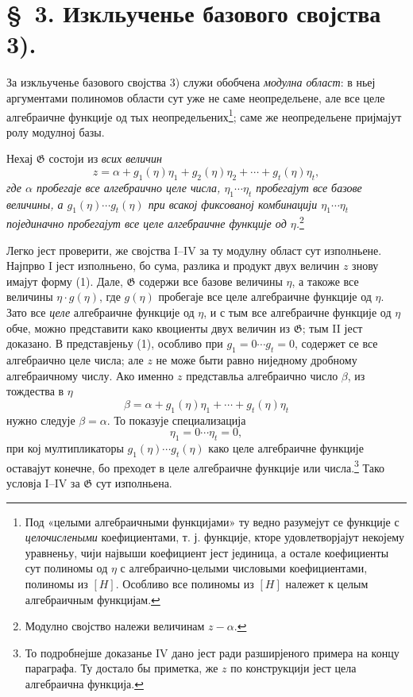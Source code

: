 ﻿\documentclass[11pt]{article}
\begin{document}
\section*{\S\ 3. Изкльученье базового својства 3).}

За изкльученье базового својства 3) служи обобчена
{\itshape модулна област}: в ньеј аргументами полиномов области сут уже не саме
неопредельене, але все целе алгебраичне функције од тых
неопредельених\footnote{Под «целыми алгебраичными функцијами» ту ведно
разумејут се функције с {\itshape целочислеными} коефициентами, т. ј. функције,
кторе удовлетворјајут некојему уравненьу, чији највыши коефициент јест
јединица, а остале коефициенты сут полиномы од $\eta$ с алгебраично-целыми
числовыми коефициентами, полиномы из $[H]$. Особливо все полиномы из $[H]$
належет к целым алгебраичным функцијам.}; саме же неопредельене пријмајут ролу
модулној базы.

Нехај $\mathfrak G$ состоји из {\itshape всих величин}
\begin{equation}
 z=\alpha+g_1(\eta)\eta_1+g_2(\eta)\eta_2+\cdots+g_t(\eta)\eta_t,
\tag{1}
\end{equation}
{\itshape где $\alpha$ пробегаје все алгебраично целе числа,
$\eta_1\cdots\eta_t$ пробегајут все базове величины, а
$g_1(\eta)\cdots g_t(\eta)$ при всакој фиксованој комбинацији
$\eta_1\cdots\eta_t$ појединачно пробегајут все целе алгебраичне функције од
$\eta$.}\footnote{Модулно својство належи величинам $z-\alpha$.}

Легко јест проверити, же својства I--IV за ту модулну област сут изполньене.
Најпрво I јест изполньено, бо сума, разлика и продукт двух величин $z$ знову
имајут форму (1). Дале, $\mathfrak G$ содержи все базове величины $\eta$, а
такоже все величины $\eta\cdot g(\eta)$, где $g(\eta)$ пробегаје все целе
алгебраичне функције од $\eta$. Зато все {\itshape целе} алгебраичне функције
од $\eta$, и с тым все алгебраичне функције од $\eta$ обче, можно представити
како квоциенты двух величин из $\mathfrak G$; тым II јест доказано. В
представјеньу (1), особливо при $g_1=0\cdots g_t=0$, содержет се все
алгебраично целе числа; але $z$ не може быти равно ниједному дробному
алгебраичному числу. Ако именно $z$ представльа алгебраично число $\beta$, из
тождества в $\eta$
\[
 \beta=\alpha+g_1(\eta)\eta_1+\cdots+g_t(\eta)\eta_t
\]
нужно следује $\beta=\alpha$. То показује специализација
\[
 \eta_1=0\cdots \eta_t=0,
\]
при кој мултипликаторы $g_1(\eta)\cdots g_t(\eta)$ како целе алгебраичне
функције оставајут конечне, бо преходет в целе алгебраичне функције или
числа.\footnote{То подробнејше доказанье IV дано јест ради разширјеного примера
на концу параграфа. Ту достало бы приметка, же $z$ по конструкцији јест цела
алгебраична функција.} Тако условја I--IV за $\mathfrak G$ сут изполньена.
\end{document}
